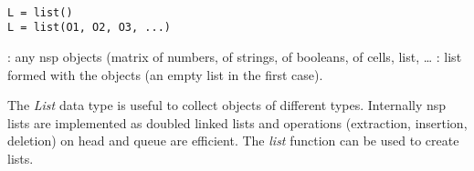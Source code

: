 
\begin{mandesc}
   \\
\end{mandesc}
\begin{calling_sequence}
\begin{verbatim}
L = list()
L = list(O1, O2, O3, ...)
\end{verbatim}
\end{calling_sequence}
\begin{parameters}
  \begin{varlist}
    :  any nsp objects (matrix of numbers, of
    strings, of booleans, of cells, list, \ldots
    : list formed with the objects (an empty list in the
    first case).
  \end{varlist}
\end{parameters}

\begin{mandescription}
The \emph{List} data type is useful to collect objects of different
types. Internally nsp lists are implemented as doubled linked lists
and operations (extraction, insertion, deletion) on head and queue
are efficient. The \emph{list} function can be used to create lists.  
\end{mandescription}

